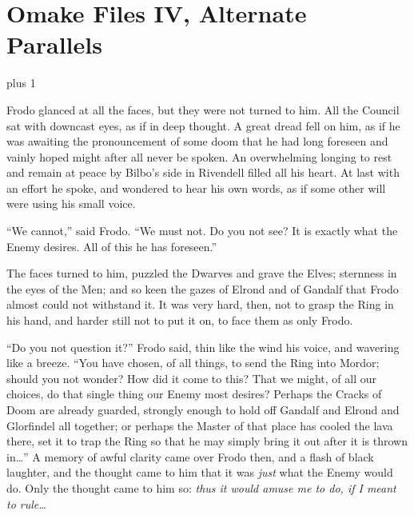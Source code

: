 
\makeatletter
\newcommand{\OmakeIVspecialsection}[2][1.5]{%
\vspace*{2\baselineskip plus 1\baselineskip minus 1\baselineskip}%
\noindent\hfill\scalebox{#1}{#2}\hfill\mbox{}%
\vskip 1\baselineskip plus 1\baselineskip%
\@afterindentfalse\@afterheading
}
\makeatother

\newcommand{\OmakeIVsection}[2][1.5]{%
  \OmakeIVspecialsection[#1]{\MakeUppercase{#2}}}

\chapter{Omake Files IV, Alternate Parallels}

\OmakeIVspecialsection[1.6]{\fontspec[ExternalLocation]{RingBearer}
\settowidth{\versewidth}{\mbox{the}}
Lord\scalebox{.40}{\parbox[b]{\versewidth}{%
        \centering of\\\nointerlineskip\vskip 4pt the}}Ratîonalît\raisebox{-.32ex}{Y}}

Frodo glanced at all the faces, but they were not turned to him. All the Council sat with downcast eyes, as if in deep thought. A great dread fell on him, as if he was awaiting the pronouncement of some doom that he had long foreseen and vainly hoped might after all never be spoken. An overwhelming longing to rest and remain at peace by Bilbo’s side in Rivendell filled all his heart. At last with an effort he spoke, and wondered to hear his own words, as if some other will were using his small voice.

“We cannot,” said Frodo. “We must not. Do you not see? It is exactly what the Enemy desires. All of this he has foreseen.”

The faces turned to him, puzzled the Dwarves and grave the Elves; sternness in the eyes of the Men; and so keen the gazes of Elrond and of Gandalf that Frodo almost could not withstand it. It was very hard, then, not to grasp the Ring in his hand, and harder still not to put it on, to face them as only Frodo.

“Do you not question it?” Frodo said, thin like the wind his voice, and wavering like a breeze. “You have chosen, of all things, to send the Ring into Mordor; should you not wonder? How did it come to this? That we might, of all our choices, do that single thing our Enemy most desires? Perhaps the Cracks of Doom are already guarded, strongly enough to hold off Gandalf and Elrond and Glorfindel all together; or perhaps the Master of that place has cooled the lava there, set it to trap the Ring so that he may simply bring it out after it is thrown in…” A memory of awful clarity came over Frodo then, and a flash of black laughter, and the thought came to him that it was \emph{just} what the Enemy would do. Only the thought came to him so: \emph{thus it would amuse me to do, if I meant to rule…}

